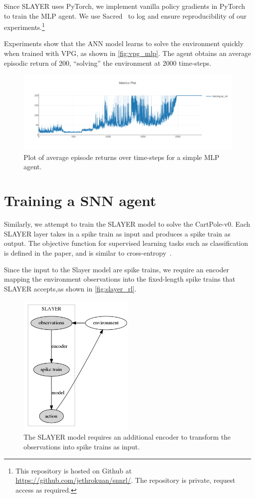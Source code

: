 \documentclass[fyp]{socreport}
\begin{document}
Since SLAYER uses PyTorch, we implement vanilla policy gradients in PyTorch to
train the MLP agent. We use Sacred~\cite{klaus_greff-proc-scipy-2017} to log and
ensure reproducibility of our experiments.\footnote{This repository is hosted on
Github at \url{https://github.com/jethrokuan/snnrl/}. The repository is private,
request access as required.}

Experiments show that the ANN model learns to solve the environment quickly when
trained with VPG, as shown in \autoref{fig:vpg_mlp}. The agent obtains an
average episodic return of 200, ``solving'' the environment at 2000 time-steps.

\begin{figure}[htbp] \centering
\includegraphics[width=.9\linewidth]{images/vpg_mlp.png}
\caption{\label{fig:vpg_mlp} Plot of average episode returns over time-steps for
a simple MLP agent.}
\end{figure}

\section{Training a SNN agent}

Similarly, we attempt to train the SLAYER model to solve the CartPole-v0. Each
SLAYER layer takes in a spike train as input and produces a spike train as
output. The objective function for supervised learning tasks such as
classification is defined in the paper, and is similar to
cross-entropy~\cite{NIPS2018_7415}.

Since the input to the Slayer model are spike trains, we require an encoder
mapping the environment observations into the fixed-length spike trains that
SLAYER accepts,as shown in \autoref{fig:slayer_rl}.

\begin{figure}[htbp] \centering
\includegraphics[height=7cm]{images/snn_encode.png}
\caption{\label{fig:slayer_rl} The SLAYER model requires an additional encoder
to transform the observations into spike trains as input.}
\end{figure}
\end{document}

